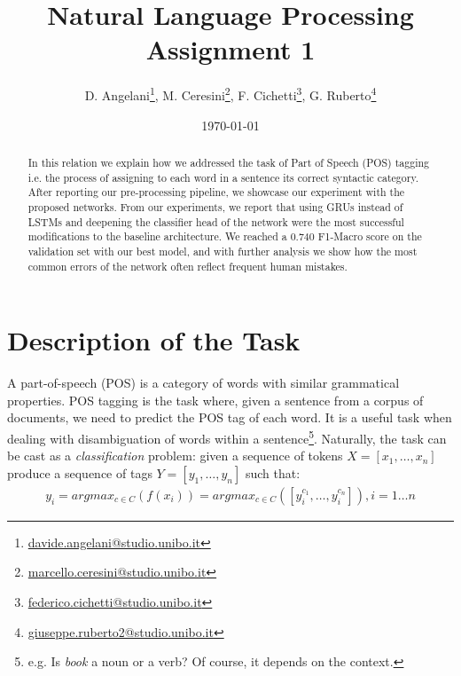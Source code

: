 \documentclass[letterpaper,10.8pt]{article}
\begin{document}
\title{Natural Language Processing\\\textbf{Assignment 1}}

\author{D. Angelani\footnote{\href{mailto:davide.angelani@studio.unibo.it}{davide.angelani@studio.unibo.it}}, M. Ceresini\footnote{\href{mailto:marcello.ceresini@studio.unibo.it}{marcello.ceresini@studio.unibo.it}}, F. Cichetti\footnote{\href{mailto:federico.cichetti@studio.unibo.it}{federico.cichetti@studio.unibo.it}}, G. Ruberto\footnote{\href{mailto:giuseppe.ruberto2@studio.unibo.it}{giuseppe.ruberto2@studio.unibo.it}}}

\date{\today}

\maketitle

\begin{abstract}
In this relation we explain how we addressed the task of Part of Speech (POS) tagging i.e. the process of assigning to each word in a sentence its correct syntactic category. After reporting our pre-processing pipeline, we showcase our experiment with the proposed networks. From our experiments, we report that using GRUs instead of LSTMs and deepening the classifier head of the network were the most successful modifications to the baseline architecture. We reached a $0.740$ F1-Macro score on the validation set with our best model, and with further analysis we show how the most common errors of the network often reflect frequent human mistakes.
\end{abstract}

\tableofcontents

\newpage

\section{Description of the Task}

A part-of-speech (POS) is a category of words with similar grammatical properties. POS tagging is the task where, given a sentence from a corpus of documents, we need to predict the POS tag of each word. It is a useful task when dealing with disambiguation of words within a sentence\footnote{e.g. Is \emph{book} a noun or a verb? Of course, it depends on the context.}. Naturally, the task can be cast as a \emph{classification} problem: given a sequence of tokens $X = [x_1, \dots, x_n]$ produce a sequence of tags $Y = [y_1, \dots, y_n]$ such that: \begin{gather*} y_i = argmax_{c \in C}(f(x_i)) = argmax_{c \in C}([y_i^{c_1}, \dots, y_i^{c_n}]), i=1 \dots n\end{gather*}
\end{document}
